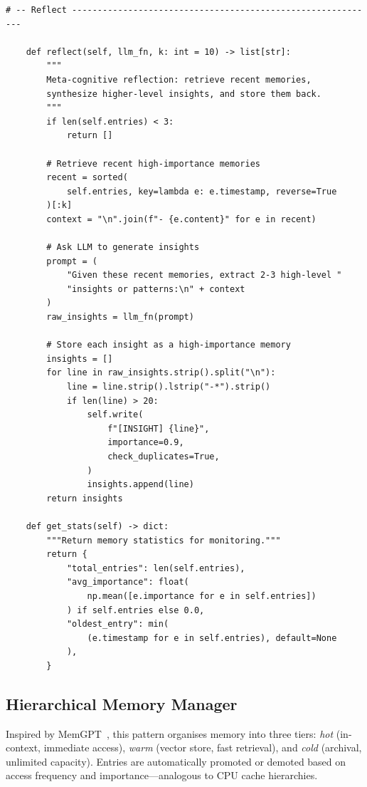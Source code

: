 \begin{lstlisting}[style=pythonstyle, caption={Vector store memory with embeddings, importance scoring, and hybrid retrieval.}]
    # -- Reflect ------------------------------------------------------------

    def reflect(self, llm_fn, k: int = 10) -> list[str]:
        """
        Meta-cognitive reflection: retrieve recent memories,
        synthesize higher-level insights, and store them back.
        """
        if len(self.entries) < 3:
            return []

        # Retrieve recent high-importance memories
        recent = sorted(
            self.entries, key=lambda e: e.timestamp, reverse=True
        )[:k]
        context = "\n".join(f"- {e.content}" for e in recent)

        # Ask LLM to generate insights
        prompt = (
            "Given these recent memories, extract 2-3 high-level "
            "insights or patterns:\n" + context
        )
        raw_insights = llm_fn(prompt)

        # Store each insight as a high-importance memory
        insights = []
        for line in raw_insights.strip().split("\n"):
            line = line.strip().lstrip("-*").strip()
            if len(line) > 20:
                self.write(
                    f"[INSIGHT] {line}",
                    importance=0.9,
                    check_duplicates=True,
                )
                insights.append(line)
        return insights

    def get_stats(self) -> dict:
        """Return memory statistics for monitoring."""
        return {
            "total_entries": len(self.entries),
            "avg_importance": float(
                np.mean([e.importance for e in self.entries])
            ) if self.entries else 0.0,
            "oldest_entry": min(
                (e.timestamp for e in self.entries), default=None
            ),
        }
\end{lstlisting}

\subsection{Hierarchical Memory Manager}
\label{hierarchical-memory-manager}

Inspired by MemGPT~\cite{packer2023memgpt}, this pattern organises memory into three tiers: \emph{hot} (in-context, immediate access), \emph{warm} (vector store, fast retrieval), and \emph{cold} (archival, unlimited capacity). Entries are automatically promoted or demoted based on access frequency and importance---analogous to CPU cache hierarchies.

